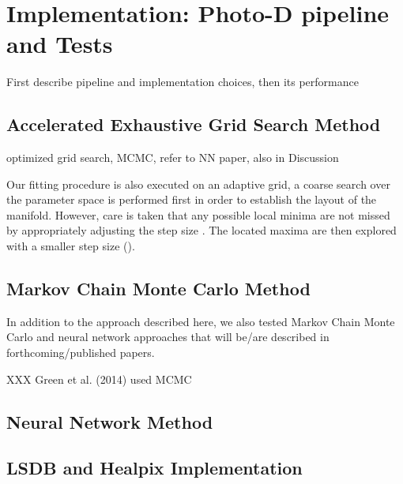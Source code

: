  




\section{Implementation: Photo-D pipeline and Tests}

First describe pipeline and implementation choices, then its performance  




\subsection{Accelerated Exhaustive Grid Search Method}
optimized grid search, MCMC, refer to NN paper, also in Discussion

Our fitting procedure is also executed on an adaptive grid, a coarse search over the parameter space is performed first in order to establish the layout of the manifold. However, care is taken that any possible local minima are not missed by appropriately adjusting the step size . The located maxima are then explored with a smaller step size ().


\subsection{Markov Chain Monte Carlo Method}

In addition to the approach described here, we also tested Markov Chain Monte Carlo and neural network approaches that will be/are described in forthcoming/published papers.


 XXX Green et al. (2014) used MCMC 


\subsection{Neural Network Method}


\subsection{LSDB and Healpix Implementation} 


